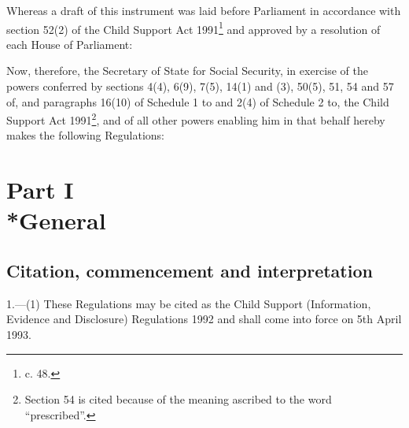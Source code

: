 \documentclass[a4paper,12pt]{article}
\title{\regstitle}
\author{S.I. 1992 No. 1812}
\date{Made 20th July 1992\\Coming into force 5th April 1993}
\begin{document}
\maketitle

\noindent
Whereas a draft of this instrument was laid before Parliament in accordance with section 52(2) of the Child Support Act 1991\footnote{ c. 48.} and approved by a resolution of each House of Parliament:

 Now, therefore, the Secretary of State for Social Security, in exercise of the powers conferred by sections 4(4), 6(9), 7(5), 14(1) and (3), 50(5), 51, 54 and 57 of, and paragraphs 16(10) of Schedule 1 to and 2(4) of Schedule 2 to, the Child Support Act 1991\footnote{\frenchspacing Section 54 is cited because of the meaning ascribed to the word “prescribed”.}, and of all other powers enabling him in that behalf hereby makes the following Regulations:

{\sloppy

\tableofcontents

}

\setcounter{secnumdepth}{-2}

\section[Part I --- General]{Part I\\*General}

\renewcommand\parthead{--- Part I}

\subsection[1. Citation, commencement and interpretation]{Citation, commencement and interpretation}

1.—(1) These Regulations may be cited as the Child Support (Information, Evidence and Disclosure) Regulations 1992 and shall come into force on 5th April 1993.
\end{document}
